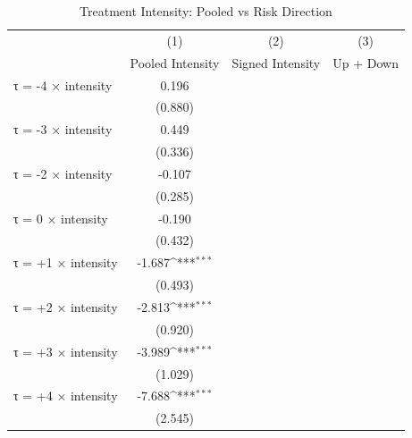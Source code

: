 \begin{table}[htbp]\centering
\def\sym#1{\ifmmode^{#1}\else\(^{#1}\)\fi}
\caption{Treatment Intensity: Pooled vs Risk Direction}
\begin{tabular}{l*{3}{c}}
\hline\hline
                    &\multicolumn{1}{c}{(1)}&\multicolumn{1}{c}{(2)}&\multicolumn{1}{c}{(3)}\\
                    &\multicolumn{1}{c}{Pooled Intensity}&\multicolumn{1}{c}{Signed Intensity}&\multicolumn{1}{c}{Up + Down}\\
\hline
τ = -4 × intensity  &       0.196         &                     &                     \\
                    &     (0.880)         &                     &                     \\
[1em]
τ = -3 × intensity  &       0.449         &                     &                     \\
                    &     (0.336)         &                     &                     \\
[1em]
τ = -2 × intensity  &      -0.107         &                     &                     \\
                    &     (0.285)         &                     &                     \\
[1em]
τ = 0 × intensity   &      -0.190         &                     &                     \\
                    &     (0.432)         &                     &                     \\
[1em]
τ = +1 × intensity  &      -1.687\sym{***}&                     &                     \\
                    &     (0.493)         &                     &                     \\
[1em]
τ = +2 × intensity  &      -2.813\sym{***}&                     &                     \\
                    &     (0.920)         &                     &                     \\
[1em]
τ = +3 × intensity  &      -3.989\sym{***}&                     &                     \\
                    &     (1.029)         &                     &                     \\
[1em]
τ = +4 × intensity  &      -7.688\sym{***}&                     &                     \\
                    &     (2.545)         &                     &                     \\

\end{tabular}
\end{table}
